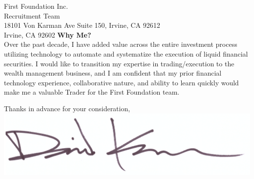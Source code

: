 \documentclass{letter}
\begin{document}
\begin{letter}{
  First Foundation Inc. \\ 
  Recruitment Team \\
  18101 Von Karman Ave Suite 150, Irvine, CA 92612 \\ 
  Irvine, CA 92602
}
\textbf{Why Me?} \\
Over the past decade, I have added value across the entire investment process
utilizing technology to automate and systematize the execution of liquid financial
securities. I would like to transition my expertise in trading/execution to
the wealth management business, and I am confident that my
prior financial technology experience, collaborative nature, and ability to
learn quickly would make me a valuable Trader for the First Foundation team.

\closing{
  Thanks in advance for your consideration, \\
  \vspace{.2in}
  \includegraphics[scale=0.25]{signature.png}
}

\end{letter}
\end{document}
